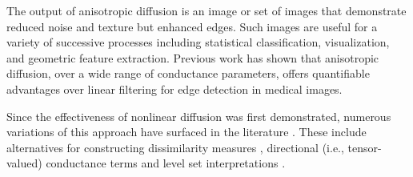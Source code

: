 The output of anisotropic diffusion is an image or set of images that
demonstrate reduced noise and texture but enhanced edges.  Such images are
useful for a variety of successive processes including statistical
classification, visualization, and geometric feature extraction.  Previous work
has shown \cite{Whitaker-thesis} that anisotropic diffusion, over a wide range
of conductance parameters, offers quantifiable advantages over linear filtering
for edge detection in medical images.  

Since the effectiveness of nonlinear diffusion was first demonstrated, numerous
variations of this approach have surfaced in the literature \cite{Romeny1994}.
These include alternatives for constructing dissimilarity measures
\cite{Sapiro1996}, directional (i.e., tensor-valued) conductance terms
\cite{Weickert1996,Alvarez1994} and level set interpretations
\cite{Whitaker2001}.
